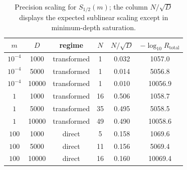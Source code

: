 \begin{table}[t]
\centering
\small
\begin{tabular}{c c c c c c}
\hline
$m$ & $D$ & regime & $N$ & $N/\sqrt{D}$ & $-\log_{10}R_{\mathrm{total}}$ \\
\hline
$10^{-4}$ & 1000 & transformed & 1 & 0.032 & 1057.0 \\
$10^{-4}$ & 5000 & transformed & 1 & 0.014 & 5056.8 \\
$10^{-4}$ & 10000 & transformed & 1 & 0.010 & 10056.9 \\
$1$ & 1000 & transformed & 16 & 0.506 & 1058.7 \\
$1$ & 5000 & transformed & 35 & 0.495 & 5058.5 \\
$1$ & 10000 & transformed & 49 & 0.490 & 10058.6 \\
$100$ & 1000 & direct & 5 & 0.158 & 1069.6 \\
$100$ & 5000 & direct & 11 & 0.156 & 5069.4 \\
$100$ & 10000 & direct & 16 & 0.160 & 10069.4 \\
\hline
\end{tabular}
\caption{Precision scaling for $S_{1/2}(m)$; the column $N/\sqrt{D}$ displays the expected sublinear scaling except in minimum-depth saturation.}
\label{tab:precision-a-half}
\end{table}
